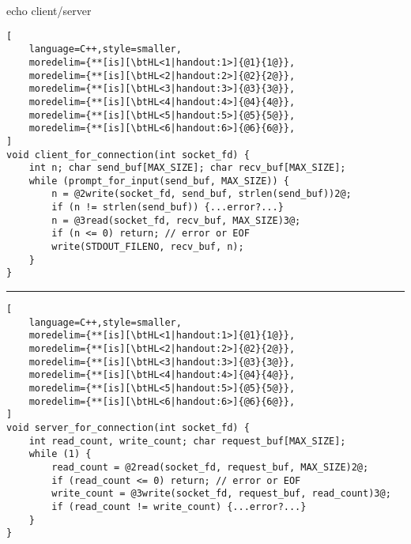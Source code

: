
\begin{frame}[fragile,label=echoClient]{echo client/server}
\begin{lstlisting}[
    language=C++,style=smaller,
    moredelim={**[is][\btHL<1|handout:1>]{@1}{1@}},
    moredelim={**[is][\btHL<2|handout:2>]{@2}{2@}},
    moredelim={**[is][\btHL<3|handout:3>]{@3}{3@}},
    moredelim={**[is][\btHL<4|handout:4>]{@4}{4@}},
    moredelim={**[is][\btHL<5|handout:5>]{@5}{5@}},
    moredelim={**[is][\btHL<6|handout:6>]{@6}{6@}},
]
void client_for_connection(int socket_fd) {
    int n; char send_buf[MAX_SIZE]; char recv_buf[MAX_SIZE];
    while (prompt_for_input(send_buf, MAX_SIZE)) {
        n = @2write(socket_fd, send_buf, strlen(send_buf))2@;
        if (n != strlen(send_buf)) {...error?...}
        n = @3read(socket_fd, recv_buf, MAX_SIZE)3@;
        if (n <= 0) return; // error or EOF 
        write(STDOUT_FILENO, recv_buf, n);
    }
}
\end{lstlisting}
\hrule
\begin{lstlisting}[
    language=C++,style=smaller,
    moredelim={**[is][\btHL<1|handout:1>]{@1}{1@}},
    moredelim={**[is][\btHL<2|handout:2>]{@2}{2@}},
    moredelim={**[is][\btHL<3|handout:3>]{@3}{3@}},
    moredelim={**[is][\btHL<4|handout:4>]{@4}{4@}},
    moredelim={**[is][\btHL<5|handout:5>]{@5}{5@}},
    moredelim={**[is][\btHL<6|handout:6>]{@6}{6@}},
]
void server_for_connection(int socket_fd) {
    int read_count, write_count; char request_buf[MAX_SIZE];
    while (1) {
        read_count = @2read(socket_fd, request_buf, MAX_SIZE)2@;
        if (read_count <= 0) return; // error or EOF 
        write_count = @3write(socket_fd, request_buf, read_count)3@;
        if (read_count != write_count) {...error?...}
    }
}
\end{lstlisting}
\end{frame}
